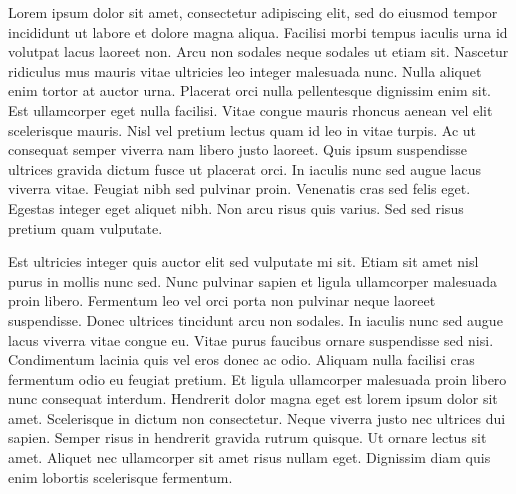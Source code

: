 
\begin{acknowledgements}      


Lorem ipsum dolor sit amet, consectetur adipiscing elit, sed do eiusmod tempor incididunt ut labore et dolore magna aliqua. Facilisi morbi tempus iaculis urna id volutpat lacus laoreet non. Arcu non sodales neque sodales ut etiam sit. Nascetur ridiculus mus mauris vitae ultricies leo integer malesuada nunc. Nulla aliquet enim tortor at auctor urna. Placerat orci nulla pellentesque dignissim enim sit. Est ullamcorper eget nulla facilisi. Vitae congue mauris rhoncus aenean vel elit scelerisque mauris. Nisl vel pretium lectus quam id leo in vitae turpis. Ac ut consequat semper viverra nam libero justo laoreet. Quis ipsum suspendisse ultrices gravida dictum fusce ut placerat orci. In iaculis nunc sed augue lacus viverra vitae. Feugiat nibh sed pulvinar proin. Venenatis cras sed felis eget. Egestas integer eget aliquet nibh. Non arcu risus quis varius. Sed sed risus pretium quam vulputate.

Est ultricies integer quis auctor elit sed vulputate mi sit. Etiam sit amet nisl purus in mollis nunc sed. Nunc pulvinar sapien et ligula ullamcorper malesuada proin libero. Fermentum leo vel orci porta non pulvinar neque laoreet suspendisse. Donec ultrices tincidunt arcu non sodales. In iaculis nunc sed augue lacus viverra vitae congue eu. Vitae purus faucibus ornare suspendisse sed nisi. Condimentum lacinia quis vel eros donec ac odio. Aliquam nulla facilisi cras fermentum odio eu feugiat pretium. Et ligula ullamcorper malesuada proin libero nunc consequat interdum. Hendrerit dolor magna eget est lorem ipsum dolor sit amet. Scelerisque in dictum non consectetur. Neque viverra justo nec ultrices dui sapien. Semper risus in hendrerit gravida rutrum quisque. Ut ornare lectus sit amet. Aliquet nec ullamcorper sit amet risus nullam eget. Dignissim diam quis enim lobortis scelerisque fermentum.     


\end{acknowledgements}

